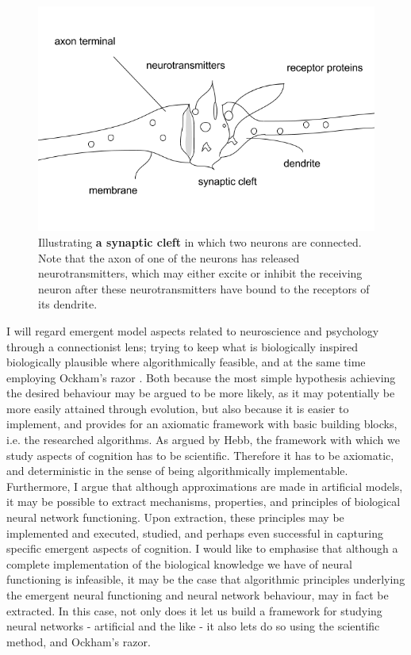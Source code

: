 \begin{figure}
    \centering
    \includegraphics[width=12cm]{fig/synaptic-cleft}
    \caption{Illustrating \textbf{a synaptic cleft} in which two neurons are connected. Note that the axon of one of the neurons has released neurotransmitters, which may either excite or inhibit the receiving neuron after these neurotransmitters have bound to the receptors of its dendrite.}
    \label{fig:synaptic-cleft}
\end{figure}

I will regard emergent model aspects related to neuroscience and psychology through a connectionist lens; trying to keep what is biologically inspired biologically plausible where algorithmically feasible, and at the same time employing Ockham's razor \citep{Russell2009chpt18}. Both because the most simple hypothesis achieving the desired behaviour may be argued to be more likely, as it may potentially be more easily attained through evolution, but also because it is easier to implement, and provides for an axiomatic framework with basic building blocks, i.e. the researched algorithms. As argued by Hebb, the framework with which we study aspects of cognition has to be scientific. Therefore it has to be axiomatic, and deterministic in the sense of being algorithmically implementable. Furthermore, I argue that although approximations are made in artificial models, it may be possible to extract mechanisms, properties, and principles of biological neural network functioning. Upon extraction, these principles may be implemented and executed, studied, and perhaps even successful in capturing specific emergent aspects of cognition. I would like to emphasise that although a complete implementation of the biological knowledge we have of neural functioning is infeasible, it may be the case that algorithmic principles underlying the emergent neural functioning and neural network behaviour, may in fact be extracted. In this case, not only does it let us build a framework for studying neural networks - artificial and the like - it also lets do so using the scientific method, and Ockham's razor.


